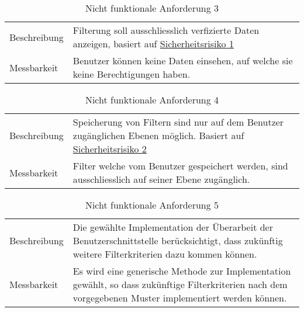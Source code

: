 \begin{table}[h!]
   \begin{tabular}{|L{0.3\textwidth}|L{0.6\textwidth}|}
       \hline
         \\[4pt]
       \hline
       Beschreibung & Filterung soll ausschliesslich verfizierte Daten anzeigen, basiert auf \color{blue}\hyperref[sec1]{\color{blue} Sicherheitsrisiko 1}\color{black}  \\
       \hline
       Messbarkeit & Benutzer können keine Daten einsehen, auf welche sie keine Berechtigungen haben.  \\
       \hline
     \end{tabular}
     \caption{Nicht funktionale Anforderung 3}
\end{table}

\begin{table}[h!]
   \begin{tabular}{|L{0.3\textwidth}|L{0.6\textwidth}|}
       \hline
         \\[4pt]
       \hline
       Beschreibung & Speicherung von Filtern sind nur auf dem Benutzer zugänglichen Ebenen möglich. Basiert auf \color{blue}\hyperref[sec2]{\color{blue} Sicherheitsrisiko 2}\color{black}  \\
       \hline
       Messbarkeit & Filter welche vom Benutzer gespeichert werden, sind ausschliesslich auf seiner Ebene zugänglich.  \\
       \hline
     \end{tabular}
     \caption{Nicht funktionale Anforderung 4}
\end{table}

\begin{table}[h!]
   \begin{tabular}{|L{0.3\textwidth}|L{0.6\textwidth}|}
       \hline
         \\[4pt]
       \hline
       Beschreibung & Die gewählte Implementation der Überarbeit der Benutzerschnittstelle berücksichtigt, dass zukünftig
       weitere Filterkriterien dazu kommen können. \\
       \hline
       Messbarkeit & Es wird eine generische Methode zur Implementation gewählt, so dass zukünftige Filterkriterien nach dem 
       vorgegebenen Muster implementiert werden können.  \\
       \hline
     \end{tabular}
     \caption{Nicht funktionale Anforderung 5}
\end{table}

